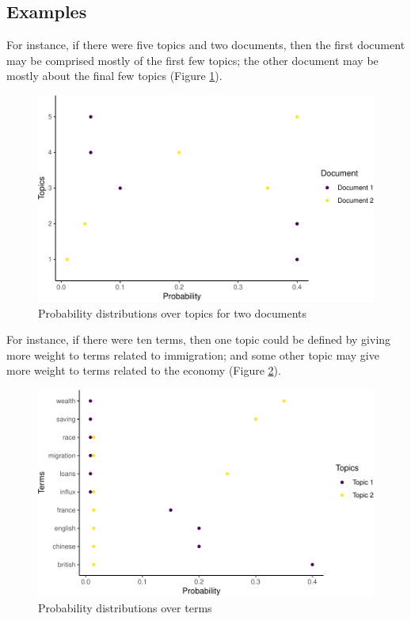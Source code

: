 \documentclass[12pt,]{article}
\theoremstyle{definition}
\theoremstyle{definition}
\theoremstyle{definition}
\theoremstyle{remark}
\begin{document}
\subsection{Examples}\label{LDAexample}

For instance, if there were five topics and two documents, then the
first document may be comprised mostly of the first few topics; the
other document may be mostly about the final few topics (Figure
\ref{fig:topicsoverdocuments}).

\begin{figure}
\centering
\includegraphics{svm-rmarkdown-article-example_files/figure-latex/topicsoverdocuments-1.pdf}
\caption{\label{fig:topicsoverdocuments}Probability distributions over
topics for two documents}
\end{figure}

For instance, if there were ten terms, then one topic could be defined
by giving more weight to terms related to immigration; and some other
topic may give more weight to terms related to the economy (Figure
\ref{fig:topicsoverterms}).

\begin{figure}
\centering
\includegraphics{svm-rmarkdown-article-example_files/figure-latex/topicsoverterms-1.pdf}
\caption{\label{fig:topicsoverterms}Probability distributions over terms}
\end{figure}
\end{document}
